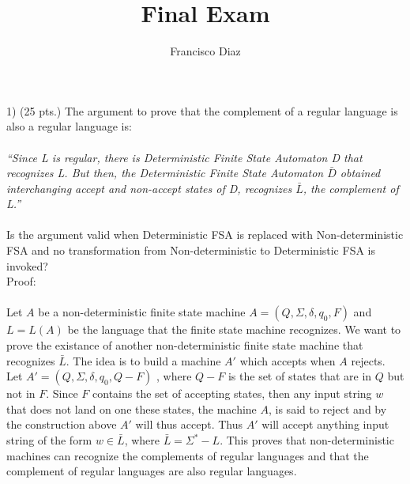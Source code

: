 \documentclass{report}
\title{Final Exam}
\author{Francisco  Diaz  }
\begin{document}
\maketitle
1) (25 pts.) The argument to prove that the complement of a regular language is also a regular language is: \\ \\
\textit{“Since L is regular, there is Deterministic Finite State Automaton D that recognizes L. But then, the Deterministic Finite State Automaton $\bar{D}$ obtained interchanging accept and non-accept states of D, recognizes $\bar{L} $, the complement of L.”}  \\ \\ Is the argument valid when Deterministic FSA is replaced with Non-deterministic FSA and no transformation from Non-deterministic to Deterministic FSA is invoked?\\[0.2in] 



Proof: \\ \\ 

Let $A$ be a non-deterministic finite state machine $A = (Q, \Sigma, \delta, q_0, F)$  and $L = L(A)$ be the language that the finite state machine recognizes. We want to prove the existance of another non-deterministic finite state machine that recognizes $\bar L$. The idea is to build a machine $A'$ which accepts when $A$ rejects. Let $A' = (Q,\Sigma, \delta,q_0, Q-F)$ , where $Q-F$ is the set of states that are in $Q$ but not in $F$. Since $F$ contains the set of accepting states, then any input string $w$ that does not land on one these states, the machine $A$, is said to reject and by the construction above $A'$ will thus accept. Thus $A'$ will accept anything input string of the form $w \in \bar L$, where  $\bar L = \Sigma^*- L$. This proves that non-deterministic machines can recognize the complements of regular languages and that the complement of regular languages are also regular languages.    \\ \\
\end{document}
